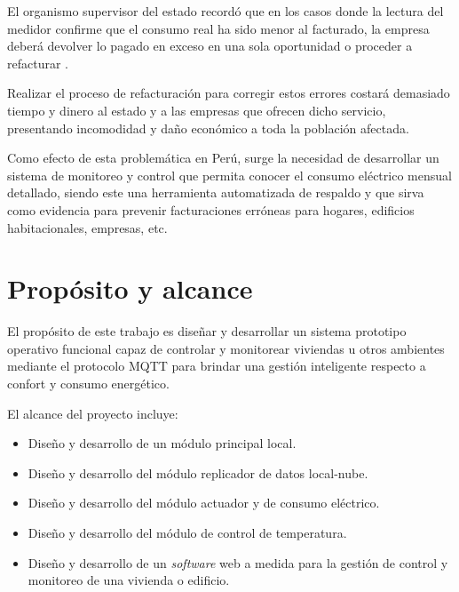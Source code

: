 El organismo supervisor del estado recordó que en los casos donde la lectura del medidor confirme que el consumo real ha sido menor al facturado, la empresa deberá devolver lo pagado en exceso en una sola oportunidad o proceder a refacturar \citep{WEBSITE:2}.

Realizar el proceso de refacturación para corregir estos errores costará demasiado tiempo y dinero al estado y a las empresas que ofrecen dicho servicio, presentando incomodidad y daño económico a toda la población afectada. 

Como efecto de esta problemática en Perú, surge la necesidad de desarrollar un sistema de monitoreo y control que permita conocer el consumo eléctrico mensual detallado, siendo este una herramienta automatizada de respaldo y que sirva como evidencia para prevenir facturaciones erróneas para hogares, edificios habitacionales, empresas, etc.




\section{Propósito y alcance}




El propósito de este trabajo es diseñar y desarrollar un sistema prototipo operativo funcional capaz de controlar y monitorear viviendas u otros ambientes mediante el protocolo MQTT para brindar una gestión inteligente respecto a confort y consumo energético.


El alcance del proyecto incluye:
\begin{itemize}
\item Diseño y desarrollo de un módulo principal local.
\item Diseño y desarrollo del módulo replicador de datos local-nube.
\item Diseño y desarrollo del módulo actuador y de consumo eléctrico.
\item Diseño y desarrollo del módulo de control de temperatura.
\item Diseño y desarrollo de un \emph{software} web a medida para la gestión de control y monitoreo de una vivienda o edificio.
\end{itemize}

